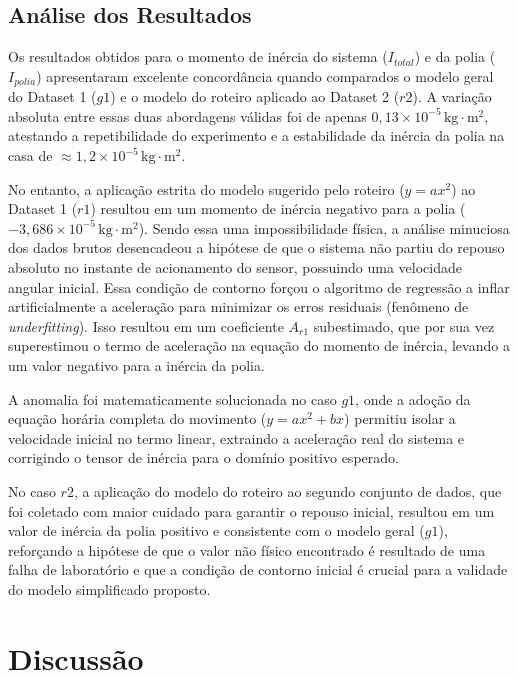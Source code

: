 \documentclass[12pt,a4paper]{article}
\begin{document}
\subsection{Análise dos Resultados}

Os resultados obtidos para o momento de inércia do sistema ($I_{total}$) e da polia ($I_{polia}$) apresentaram excelente concordância quando comparados o modelo geral do Dataset 1 ($g1$) e o modelo do roteiro aplicado ao Dataset 2 ($r2$). A variação absoluta entre essas duas abordagens válidas foi de apenas $0,13 \times 10^{-5} \, \text{kg}\cdot\text{m}^2$, atestando a repetibilidade do experimento e a estabilidade da inércia da polia na casa de $\approx 1,2 \times 10^{-5} \, \text{kg}\cdot\text{m}^2$.

No entanto, a aplicação estrita do modelo sugerido pelo roteiro ($y = ax^2$) ao Dataset 1 ($r1$) resultou em um momento de inércia negativo para a polia ($-3,686 \times 10^{-5} \, \text{kg}\cdot\text{m}^2$). Sendo essa uma impossibilidade física, a análise minuciosa dos dados brutos desencadeou a hipótese de que o sistema não partiu do repouso absoluto no instante de acionamento do sensor, possuindo uma velocidade angular inicial. Essa condição de contorno forçou o algoritmo de regressão a inflar artificialmente a aceleração para minimizar os erros residuais (fenômeno de \textit{underfitting}). Isso resultou em um coeficiente $A_{r1}$ subestimado, que por sua vez superestimou o termo de aceleração na equação do momento de inércia, levando a um valor negativo para a inércia da polia.

A anomalia foi matematicamente solucionada no caso $g1$, onde a adoção da equação horária completa do movimento ($y = ax^2 + bx$) permitiu isolar a velocidade inicial no termo linear, extraindo a aceleração real do sistema e corrigindo o tensor de inércia para o domínio positivo esperado.

No caso $r2$, a aplicação do modelo do roteiro ao segundo conjunto de dados, que foi coletado com maior cuidado para garantir o repouso inicial, resultou em um valor de inércia da polia positivo e consistente com o modelo geral ($g1$), reforçando a hipótese de que o valor não físico encontrado é resultado de uma falha de laboratório e que a condição de contorno inicial é crucial para a validade do modelo simplificado proposto.

\section{Discussão}
\end{document}
